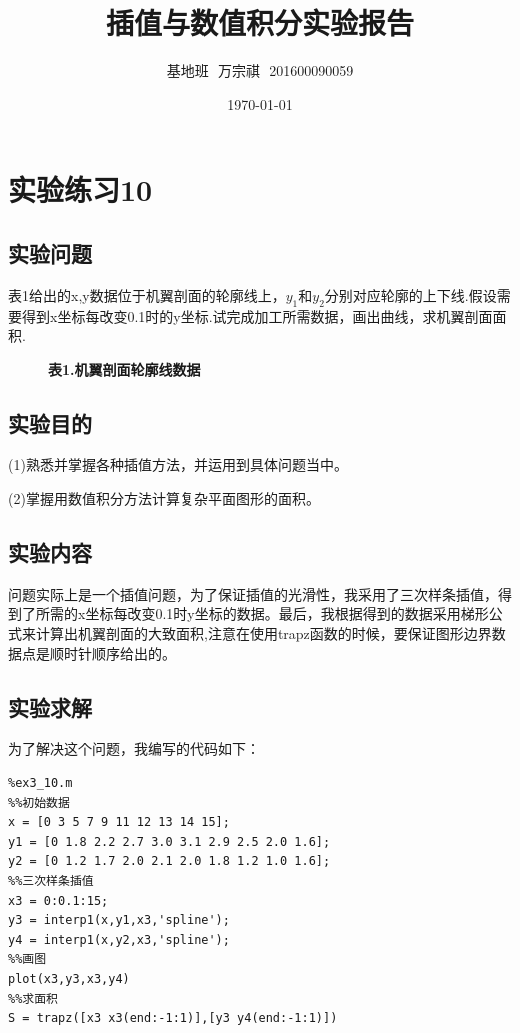 \documentclass[UTF8]{article}
\title{插值与数值积分实验报告}
\author{基地班\, \,万宗祺\, \,201600090059}
\date{\today}
\begin{document}
\maketitle
\tableofcontents
\section{实验练习10}
\subsection{实验问题}
表1给出的x,y数据位于机翼剖面的轮廓线上，$y_1$和$y_2$分别对应轮廓的上下线.假设需要得到x坐标每改变0.1时的y坐标.试完成加工所需数据，画出曲线，求机翼剖面面积.
\begin{figure}[htbp]
\centering
\textbf{表1.机翼剖面轮廓线数据}

\end{figure}
\subsection{实验目的}
(1)熟悉并掌握各种插值方法，并运用到具体问题当中。

(2)掌握用数值积分方法计算复杂平面图形的面积。
\subsection{实验内容}
问题实际上是一个插值问题，为了保证插值的光滑性，我采用了三次样条插值，得到了所需的x坐标每改变0.1时y坐标的数据。最后，我根据得到的数据采用梯形公式来计算出机翼剖面的大致面积,注意在使用trapz函数的时候，要保证图形边界数据点是顺时针顺序给出的。
\subsection{实验求解}
为了解决这个问题，我编写的代码如下：
\lstset{language=Matlab}
\begin{lstlisting}
%ex3_10.m
%%初始数据
x = [0 3 5 7 9 11 12 13 14 15];
y1 = [0 1.8 2.2 2.7 3.0 3.1 2.9 2.5 2.0 1.6];
y2 = [0 1.2 1.7 2.0 2.1 2.0 1.8 1.2 1.0 1.6];
%%三次样条插值
x3 = 0:0.1:15;
y3 = interp1(x,y1,x3,'spline');
y4 = interp1(x,y2,x3,'spline');
%%画图
plot(x3,y3,x3,y4)
%%求面积
S = trapz([x3 x3(end:-1:1)],[y3 y4(end:-1:1)])
\end{lstlisting}
\end{document}
